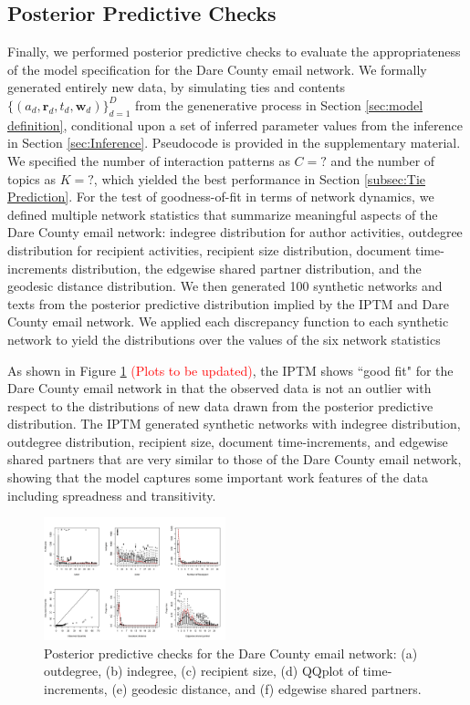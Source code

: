 \documentclass{article}
\begin{document}
 	   \subsection{Posterior Predictive Checks}\label{subsec:PPC}
 	   Finally, we performed posterior predictive checks \cite{rubin1984bayesianly} to evaluate the appropriateness of the model specification for the Dare County email network. We formally generated entirely new data, by simulating ties and contents $\{(a_{d}, \boldsymbol{r}_{d}, t_{d}, \boldsymbol{w}_{d})\}_{d=1}^D$ from the genenerative process in Section \ref{sec:model definition}, conditional upon a set of inferred parameter values from the inference in Section \ref{sec:Inference}. Pseudocode is provided in the supplementary material. We specified the number of interaction patterns as $C=?$ and the number of topics as $K = ?$, which yielded the best performance in Section \ref{subsec:Tie Prediction}. For the test of goodness-of-fit in terms of network dynamics, we defined multiple network statistics that summarize meaningful aspects of the Dare County email network: indegree distribution for author activities, outdegree distribution for recipient activities, recipient size distribution, document time-increments distribution, the edgewise shared partner distribution, and the geodesic distance distribution. We then generated 100 synthetic networks and texts from the posterior predictive distribution implied by the IPTM and Dare County email network.
 	   We applied each discrepancy function to each synthetic network to yield the distributions over the values of the six network statistics
 	   
 	   As shown in Figure \ref{fig:PPC} \textcolor{red}{(Plots to be updated)}, the IPTM shows ``good fit" for the Dare County email network in that the observed data is not an outlier with respect to the distributions of new data drawn from the posterior predictive distribution. The IPTM generated synthetic networks with indegree distribution, outdegree distribution, recipient size, document time-increments, and edgewise shared partners that are very similar to those of the Dare County email network, showing that the model captures some important work features of the data including spreadness and transitivity. 
 	   \begin{figure}[tb]
 	   	\centering
 	   	\includegraphics[width = 0.47\textwidth]{plots/PPC_plot-1.png}
 	   	\caption{Posterior predictive checks for the Dare County email network: (a) outdegree, (b) indegree, (c) recipient size, (d) QQplot of time-increments, (e) geodesic distance, and (f) edgewise shared partners.}
 	   	\label{fig:PPC}
 	   \end{figure}
\end{document}
